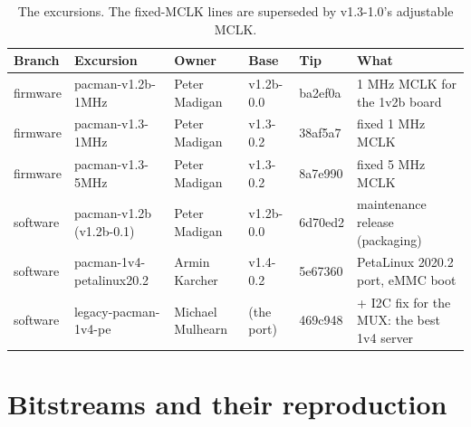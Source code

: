 \documentclass[11pt]{article}
\begin{document}
\begin{table}[h]
\centering\small
\begin{tabularx}{\textwidth}{@{}lllllL@{}}
\toprule
Branch & Excursion & Owner & Base & Tip & What \\
\midrule
firmware & pacman-v1.2b-1MHz & Peter Madigan & v1.2b-0.0 & ba2ef0a & 1 MHz MCLK for the 1v2b board \\
firmware & pacman-v1.3-1MHz & Peter Madigan & v1.3-0.2 & 38af5a7 & fixed 1 MHz MCLK \\
firmware & pacman-v1.3-5MHz & Peter Madigan & v1.3-0.2 & 8a7e990 & fixed 5 MHz MCLK \\
software & pacman-v1.2b (v1.2b-0.1) & Peter Madigan & v1.2b-0.0 & 6d70ed2 & maintenance release (packaging) \\
software & pacman-1v4-petalinux20.2 & Armin Karcher & v1.4-0.2 & 5e67360 & PetaLinux 2020.2 port, eMMC boot \\
software & legacy-pacman-1v4-pe & Michael Mulhearn & (the port) & 469c948 & + I2C fix for the MUX: the best 1v4
server \\
\bottomrule
\end{tabularx}
\caption{The excursions.  The fixed-MCLK lines are superseded by v1.3-1.0's adjustable MCLK.}
\end{table}

\section{Bitstreams and their reproduction}
\end{document}

